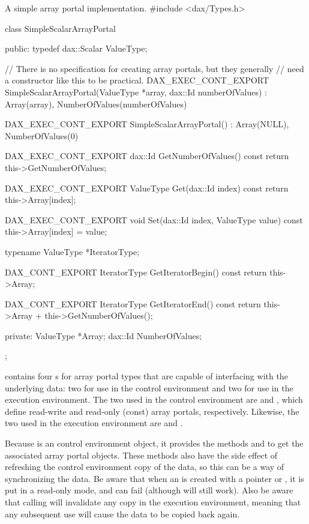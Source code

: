 \begin{daxexample}{A simple array portal implementation.}
#include <dax/Types.h>

class SimpleScalarArrayPortal
{
public:
  typedef dax::Scalar ValueType;

  // There is no specification for creating array portals, but they generally
  // need a constructor like this to be practical.
  DAX_EXEC_CONT_EXPORT
  SimpleScalarArrayPortal(ValueType *array, dax::Id numberOfValues)
    : Array(array), NumberOfValues(numberOfValues) {  }

  DAX_EXEC_CONT_EXPORT
  SimpleScalarArrayPortal() : Array(NULL), NumberOfValues(0) {  }

  DAX_EXEC_CONT_EXPORT
  dax::Id GetNumberOfValues() const { return this->GetNumberOfValues; }

  DAX_EXEC_CONT_EXPORT
  ValueType Get(dax::Id index) const { return this->Array[index]; }

  DAX_EXEC_CONT_EXPORT
  void Set(dax::Id index, ValueType value) const { this->Array[index] = value; }

  typename ValueType *IteratorType;

  DAX_CONT_EXPORT
  IteratorType GetIteratorBegin() const { return this->Array; }

  DAX_CONT_EXPORT
  IteratorType GetIteratorEnd() const { return this->Array + this->GetNumberOfValues(); }

private:
  ValueType *Array;
  dax::Id NumberOfValues;
};
\end{daxexample}

 contains four s for array portal
types that are capable of interfacing with the underlying data: two for use
in the control environment and two for use in the execution
environment. The two used in the control environment are
 and , which define
read-write and read-only (const) array portals, respectively. Likewise, the
two used in the execution environment are  and
.

Because  is an control environment object, it provides
the methods  and
 to get the associated array portal
objects. These methods also have the side effect of refreshing the control
environment copy of the data, so this can be a way of synchronizing the
data. Be aware that when an  is created with a pointer
or , it is put in a read-only mode, and
 can fail (although
 will still work). Also be aware that
calling  will invalidate any copy in the
execution environment, meaning that any subsequent use will cause the data
to be copied back again.


